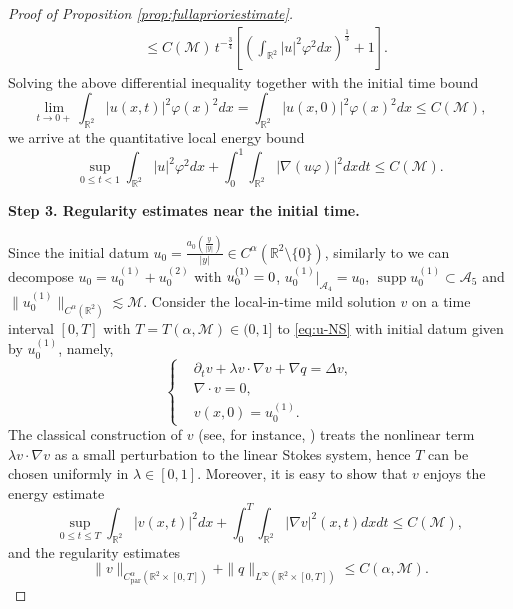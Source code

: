 \documentclass[12pt,reqno]{amsart}
\theoremstyle{plain}
\theoremstyle{definition}
\newcommand{\R}{\mathbb{R}}
\newcommand{\supp}{\mathop{\mathrm{supp}}}
\newcommand{\M}{\mathcal{M}}
\newcommand{\A}{\mathcal{A}}
\renewcommand{\:}{\colon}
\let\div\relax
\DeclareMathOperator{\div}{div}
\numberwithin{equation}{section}
\numberwithin{figure}{section}
\begin{document}
\begin{proof}[Proof of Proposition \ref{prop:fullaprioriestimate}]
\begin{align}
    &\le C(\M) \, t^{-\frac34} \left[\left( \int_{\R^2} |u|^2\varphi^2 dx\right)^\frac13 +1 \right].
\end{align}
Solving the above differential inequality together with the initial time bound
\begin{equation}
     \lim_{t \to 0+} \int_{\R^2} |u(x, t)|^2\varphi(x)^2 dx = \int_{\R^2} |u(x, 0)|^2\varphi(x)^2 dx \le C(\M),
\end{equation}
we arrive at the quantitative local energy bound
\begin{equation}
    \sup_{0\le t < 1} \int_{\R^2} |u|^2\varphi^2 dx + \int_0^1 \int_{\R^2} |\nabla (u \varphi)|^2 dx dt \le C(\M). 
\end{equation}

\smallskip
\textbf{Step 3. Regularity estimates near the initial time.}
\smallskip

Since the initial datum $u_0 = \frac{a_0\left(\frac{y}{|y|}\right)}{|y|} \in C^\alpha(\R^2 \setminus \{0\})$, similarly to \cite{Jiasver2013} we can decompose $u_0 = u_0^{(1)} + u_0^{(2)}$ with $\div u_0^{(1)} = 0$, $u_0^{(1)}|_{\A_{4}} = u_0$, $\supp u_0^{(1)} \subset \A_5$ and $\|u_0^{(1)}\|_{C^\alpha(\R^2)} \lesssim \M$.  Consider the local-in-time mild solution $v$ on a  time interval $[0,T]$ with $T = T(\alpha, \M) \in (0,1]$ to \eqref{eq:u-NS} with  initial datum given by $u_0^{(1)}$, namely,
\begin{equation} \label{eq:v-NS}
    \left\{\begin{aligned}
        &\partial_t v +  \lambda v \cdot \nabla v + \nabla q = \Delta v, \\
        &\nabla \cdot v = 0, \\
        &v(x, 0) =  u_0^{(1)}.
    \end{aligned}
    \right.
\end{equation}
The classical construction of $v$ (see, for instance, \cite{fujitakato, kato}) treats the nonlinear term $\lambda v \cdot \nabla v$ as a small perturbation to the linear Stokes system, hence $T$ can be chosen uniformly in $\lambda \in [0,1]$. Moreover, it is easy to show that $v$ enjoys the energy estimate
\begin{equation}
	 \sup_{0\le t \le T} \int_{\R^2} |v(x,t)|^2 dx + \int_0^{T} \int_{\R^2} |\nabla v|^2(x,t) dx dt  \le C(\M),
\end{equation}
and the regularity estimates
\begin{equation} \label{eq:vq-reg}
	\|v\|_{C^\alpha_{\text{par}}(\R^2 \times [0, T])}+ \|q\|_{L^\infty(\R^2\times [0, T])}  \le C(\alpha, \M).
\end{equation}



\end{proof}
\end{document}
